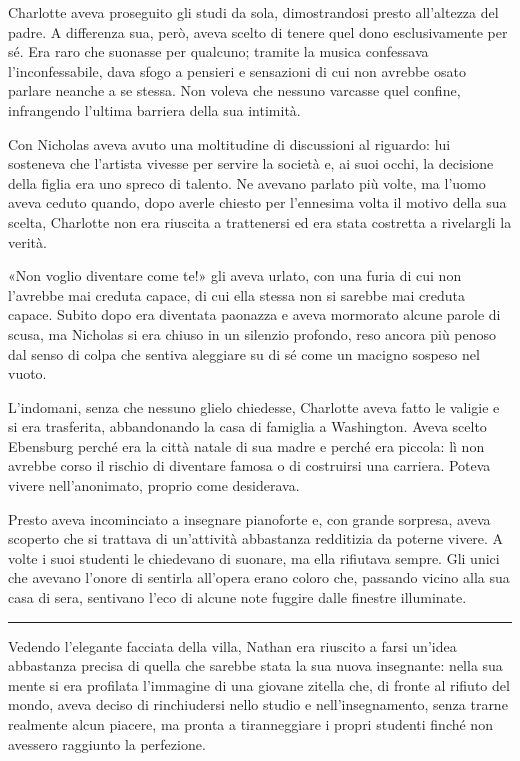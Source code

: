 \documentclass[a4paper,oneside,11pt]{memoir}
\begin{document}
Charlotte aveva proseguito gli studi da sola, dimostrandosi presto all'altezza
del padre. A differenza sua, però, aveva scelto di tenere quel dono
esclusivamente per sé. Era raro che suonasse per qualcuno; tramite la musica
confessava l'inconfessabile, dava sfogo a pensieri e sensazioni di cui non
avrebbe osato parlare neanche a se stessa. Non voleva che nessuno varcasse quel
confine, infrangendo l'ultima barriera della sua intimità.

Con Nicholas aveva avuto una moltitudine di discussioni al riguardo: lui
sosteneva che l'artista vivesse per servire la società e, ai suoi occhi, la
decisione della figlia era uno spreco di talento. Ne avevano parlato più volte,
ma l'uomo aveva ceduto quando, dopo averle chiesto per l'ennesima volta il
motivo della sua scelta, Charlotte non era riuscita a trattenersi ed era stata
costretta a rivelargli la verità.

«Non voglio diventare come te!» gli aveva urlato, con una furia di cui non
l'avrebbe mai creduta capace, di cui ella stessa non si sarebbe mai creduta
capace. Subito dopo era diventata paonazza e aveva mormorato alcune parole di
scusa, ma Nicholas si era chiuso in un silenzio profondo, reso ancora più penoso
dal senso di colpa che sentiva aleggiare su di sé come un macigno sospeso nel
vuoto.

L'indomani, senza che nessuno glielo chiedesse, Charlotte aveva fatto le valigie
e si era trasferita, abbandonando la casa di famiglia a Washington. Aveva scelto
Ebensburg perché era la città natale di sua madre e perché era piccola: lì non
avrebbe corso il rischio di diventare famosa o di costruirsi una carriera.
Poteva vivere nell'anonimato, proprio come desiderava.

Presto aveva incominciato a insegnare pianoforte e, con grande sorpresa, aveva
scoperto che si trattava di un'attività abbastanza redditizia da poterne vivere.
A volte i suoi studenti le chiedevano di suonare, ma ella rifiutava sempre. Gli
unici che avevano l'onore di sentirla all'opera erano coloro che, passando
vicino alla sua casa di sera, sentivano l'eco di alcune note fuggire dalle
finestre illuminate.

\plainbreak{1}

Vedendo l'elegante facciata della villa, Nathan era riuscito a farsi un'idea
abbastanza precisa di quella che sarebbe stata la sua nuova insegnante: nella
sua mente si era profilata l'immagine di una giovane zitella che, di fronte al
rifiuto del mondo, aveva deciso di rinchiudersi nello studio e
nell'insegnamento, senza trarne realmente alcun piacere, ma pronta a
tiranneggiare i propri studenti finché non avessero raggiunto la perfezione.
\end{document}

